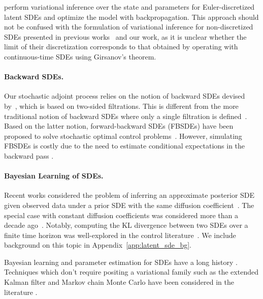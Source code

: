 \documentclass[twoside]{article}
\begin{document}
\citet{ryder2018black} perform variational inference over the state and parameters for Euler-discretized latent SDEs and optimize the model with backpropagation. 
This approach should not be confused with the formulation of variational inference for non-discretized SDEs presented in previous works~\cite{opper2019variational,ha2018adaptive,tzen2019neural} and our work, as it is unclear whether the limit of their discretization corresponds to that obtained by operating with continuous-time SDEs using Girsanov's theorem.

\paragraph{Backward SDEs.} Our stochastic adjoint process relies on the notion of backward SDEs devised by~\citet{kunita2019stochastic}, which is based on two-sided filtrations. 
This is different from the more traditional notion of backward SDEs where only a single filtration is defined~\cite{peng1990general,pardoux1992backward}. 
Based on the latter notion, forward-backward SDEs (FBSDEs) have been proposed to solve stochastic optimal control problems~\cite{peng1999fully}.
However, simulating FBSDEs is costly due to the need to estimate conditional expectations in the backward pass \cite{pardoux1992backward}. 

\paragraph{Bayesian Learning of SDEs.}
Recent works considered the problem of inferring an approximate posterior SDE given observed data under a prior SDE with the same diffusion coefficient~\citep{ha2018adaptive,tzen2019neural,opper2019variational}.
The special case with constant diffusion coefficients was considered more than a decade ago~\cite{archambeau2008variational}.
Notably, computing the KL divergence between two SDEs over a finite time horizon was well-explored in the control literature~\citep{kappen2016adaptive,theodorou2015nonlinear}. 
We include background on this topic in Appendix~\ref{app:latent_sde_bg}.

Bayesian learning and parameter estimation for SDEs have a long history \cite{gupta1974computational}. Techniques which don't require positing a variational family such as the extended Kalman filter and Markov chain Monte Carlo have been considered in the literature \cite{mbalawata2013parameter}.
 \vspace{-2mm}
\end{document}
